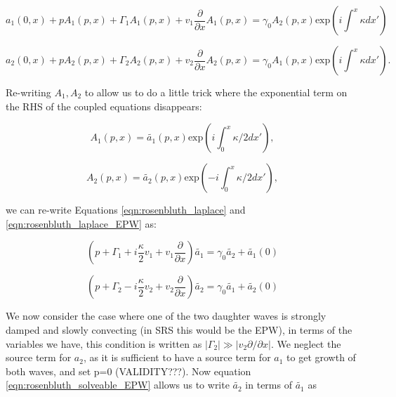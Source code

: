 \begin{equation}\label{eqn:rosenbluth_laplace}
a_1(0,x) + pA_1(p,x) + \Gamma_1 A_1(p,x) + v_1\frac{\partial}{\partial x}A_1(p,x) = \gamma_0 A_2(p,x)\text{exp}\left(i\int^x \kappa dx'\right)
\end{equation}

\begin{equation}\label{eqn:rosenbluth_laplace_EPW}
a_2(0,x) + pA_2(p,x) + \Gamma_2 A_2(p,x) + v_2\frac{\partial}{\partial x}A_2(p,x) = \gamma_0 A_1(p,x)\text{exp}\left(i\int^x \kappa dx'\right).
\end{equation}

Re-writing $A_1,A_2$ to allow us to do a little trick where the exponential term on the RHS of the coupled equations disappears:  

\begin{equation}
 A_1(p,x) = \tilde{a_1}(p,x)\text{exp}\left(i\int_0^x \kappa/2 dx'\right),
\end{equation}

\begin{equation}
 A_2(p,x) = \tilde{a_2}(p,x)\text{exp}\left(-i\int_0^x \kappa/2 dx'\right),
\end{equation}

 we can re-write Equations \ref{eqn:rosenbluth_laplace} and \ref{eqn:rosenbluth_laplace_EPW} as:

\begin{equation}\label{eqn:rosenbluth_solveable_EMW}
	\left(p + \Gamma_1 + i\frac{\kappa}{2}v_1 + v_1\frac{\partial}{\partial x}\right)\tilde{a_1} = \gamma_0 \tilde{a_2} + \tilde{a_1}(0)
\end{equation}  

\begin{equation}\label{eqn:rosenbluth_solveable_EPW}
	\left(p + \Gamma_2 - i\frac{\kappa}{2}v_2 + v_2\frac{\partial}{\partial x}\right)\tilde{a_2} = \gamma_0 \tilde{a_1} + \tilde{a_2}(0)
\end{equation}  

We now consider the case where one of the two daughter waves is strongly damped and slowly convecting (in SRS this would be the EPW), in terms of the variables we have, this condition is written as $|\Gamma_2| \gg |v_2\partial / \partial x|$. We neglect the source term for $a_2$, as it is sufficient to have a source term for $a_1$ to get growth of both waves, and set p=0 (VALIDITY???). Now equation \ref{eqn:rosenbluth_solveable_EPW} allows us to write $\tilde{a_2}$ in terms of $\tilde{a_1}$ as

